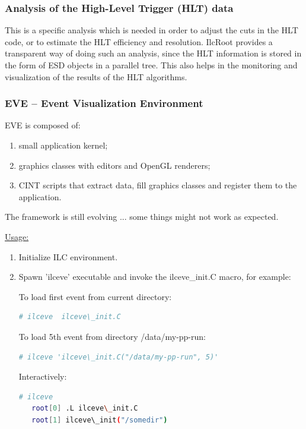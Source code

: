 \documentclass[12pt,a4paper,twoside]{article}
\makeatletter
\newcommand {\ilcroot} {IlcRoot\@\xspace}
\makeatother
\begin{document}
{\subsubsection{Analysis of the High-Level Trigger (HLT) data}

This is a specific analysis which is needed in order to adjust the cuts
in the HLT code, or to estimate the HLT
efficiency and resolution. \ilcroot provides a transparent way of doing
such an analysis, since the HLT information is stored in the form of ESD
objects in a parallel tree. This also helps in the monitoring and
visualization of the results of the HLT algorithms.


\subsubsection{EVE -- Event Visualization Environment}

EVE is composed of:
\begin{enumerate}
\item small application kernel;
\item graphics classes with editors and OpenGL renderers;
\item CINT scripts that extract data, fill graphics classes and register
   them to the application.
\end{enumerate}

The framework is still evolving ... some things might not work as expected.

\underline{Usage:}

\begin{enumerate}
\item Initialize ILC environment.
\item Spawn 'ilceve' executable and invoke the ilceve\_init.C macro,
  for example:

To load first event from current directory:
\begin{lstlisting}[language=sh]
   # ilceve  ilceve\_init.C 
\end{lstlisting}
To load 5th event from directory /data/my-pp-run:
\begin{lstlisting}[language=sh]
   # ilceve 'ilceve\_init.C("/data/my-pp-run", 5)' 
\end{lstlisting}
Interactively:
\begin{lstlisting}[language=sh]
   # ilceve
   root[0] .L ilceve\_init.C
   root[1] ilceve\_init("/somedir")
\end{lstlisting}


\end{enumerate}}
\end{document}
